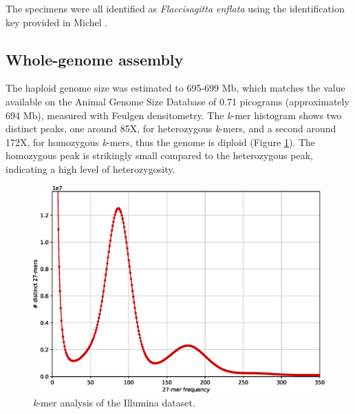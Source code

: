The specimens were all identified as \textit{Flaccisagitta enflata} using the identification key provided in Michel \cite{michel1984}. 

\subsection{Whole-genome assembly}

The haploid genome size was estimated to 695-699 Mb, which matches the value available on the Animal Genome Size Database \cite{animal_genome_size} of 0.71 picograms (approximately 694 Mb), measured with Feulgen densitometry. The \textit{k}-mer histogram shows two distinct peaks, one around 85X, for heterozygous \textit{k}-mers, and a second around 172X, for homozygous \textit{k}-mers, thus the genome is diploid (Figure \ref{fig:fenflata_kat_hist}). The homozygous peak is strikingly small compared to the heterozygous peak, indicating a high level of heterozygosity. 

\begin{figure}
    \centering
    \includegraphics[width=1\linewidth]{fig/fenflata_kat_illumina.eps}
    \caption{\textit{k}-mer analysis of the Illumina dataset.}
    \label{fig:fenflata_kat_hist}
\end{figure}

